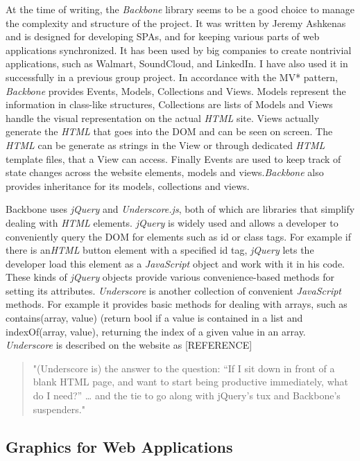 \documentclass[a4paper,11pt,twoside]{article}
\begin{document}
At the time of writing, the \textit{Backbone} library seems to be a good choice to manage the complexity and structure of the project. It was written by Jeremy Ashkenas and is designed for developing SPAs, and for keeping various parts of web applications synchronized. It has been used by big companies to create nontrivial applications, such as Walmart, SoundCloud, and LinkedIn. I have also used it in successfully in a previous group project. In accordance with the MV* pattern, \textit{Backbone} provides Events, Models, Collections and Views. Models represent the information in class-like structures, Collections are lists of Models and Views handle the visual representation on the actual \textit{HTML} site. Views actually generate the \textit{HTML} that goes into the DOM and can be seen on screen. The \textit{HTML} can be generate as strings in the View or through dedicated \textit{HTML} template files, that a View can access. Finally Events are used to keep track of state changes across the website elements, models and views.\textit{Backbone} also provides inheritance for its models, collections and views.

Backbone uses \textit{jQuery} and \textit{Underscore.js}, both of which are libraries that simplify dealing with \textit{HTML} elements. \textit{jQuery} is widely used and allows a developer to conveniently query the DOM for elements such as id or class tags. For example if there is an\textit{HTML} button element with a specified id tag, \textit{jQuery} lets the developer load this element as a \textit{JavaScript} object and work with it in his code. These kinds of \textit{jQuery} objects provide various convenience-based methods for setting its attributes. \textit{Underscore}  is another collection of convenient \textit{JavaScript} methods. For example it provides basic methods for dealing with arrays, such as contains(array, value) (return bool if a value is contained in a list and indexOf(array, value), returning the index of a given value in an array. \textit{Underscore} is described on the website as [REFERENCE]

\begin{quotation}
"(Underscore is) the answer to the question: “If I sit down in front of a blank 
HTML page, and want to start being productive immediately, what do I need?” … 
and the tie to go along with jQuery's tux and Backbone's suspenders."
\end{quotation}


\subsection{Graphics for Web Applications}
\end{document}
